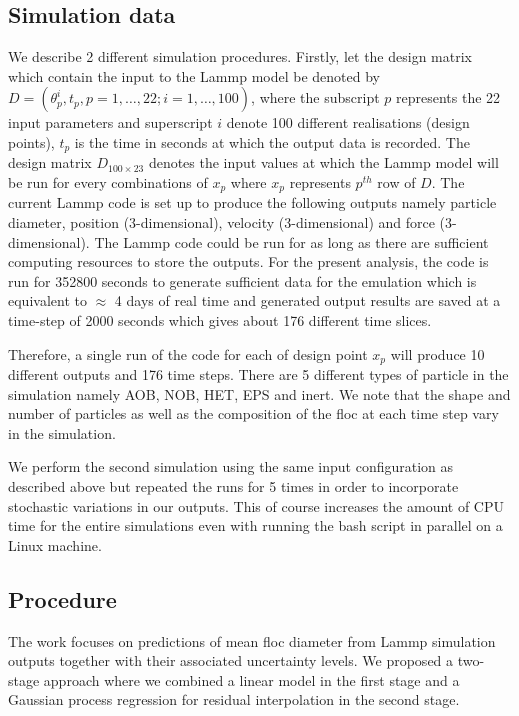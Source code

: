 \documentclass[12pt,titlepage]{report}
\theoremstyle{definition}
\theoremstyle{remark}
\begin{document}
\subsection*{Simulation data}
We describe 2 different simulation procedures. Firstly, let the design matrix which contain the input to the Lammp model be denoted by $D=(\theta^i_p, t_p, p=1,\ldots,22; i=1,\ldots,100)$, where the subscript $p$ represents the 22 input parameters and superscript $i$ denote 100 different realisations (design points), $t_p$ is the time in seconds at which the output data is recorded. The design matrix $D_{100 \times 23}$ denotes the input values at which the Lammp model will be run for every combinations of $x_p$ where $x_p$ represents $p^{th}$ row of $D$. The current Lammp code is set up to produce the following outputs namely particle diameter, position (3-dimensional), velocity (3-dimensional) and force (3-dimensional). The Lammp code could be run for as long as there are sufficient computing resources to store the outputs. For the present analysis, the code is run for 352800 seconds to generate sufficient data for the emulation which is equivalent to $\approx$ 4 days of real time and generated output results are saved at a time-step of 2000 seconds which gives about 176 different time slices. 

Therefore, a single run of the code for each of design point $x_p$ will produce 10 different outputs and 176 time steps. There are 5 different types of particle in the simulation namely AOB, NOB, HET, EPS and inert. We note that the shape and number of particles as well as the composition of the floc at each time step vary in the simulation. 

We perform the second simulation using the same input configuration as described above but repeated the runs for 5 times in order to incorporate stochastic variations in our outputs. This of course increases the amount of CPU time for the entire simulations even with running the bash script in parallel on a Linux machine. 


\subsection*{Procedure}
The work focuses on predictions of mean floc diameter from Lammp simulation outputs together with their associated uncertainty levels. We proposed a two-stage approach where we combined a linear model in the first stage and a Gaussian process regression for residual interpolation in the second stage.
\end{document}
